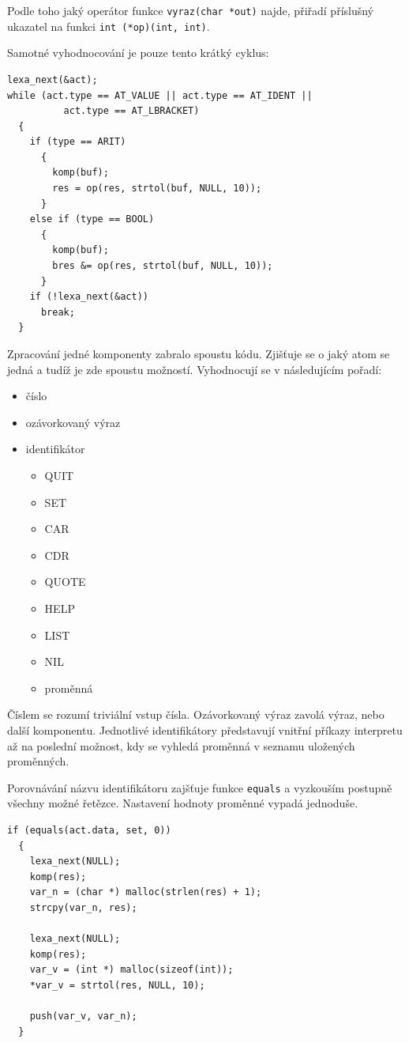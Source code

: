 \documentclass[a4paper, 12pt]{article}
\begin{document}
Podle toho jaký operátor funkce \texttt{vyraz(char *out)} najde,
přiřadí příslušný ukazatel na funkci \verb+int (*op)(int, int)+.

Samotné vyhodnocování je pouze tento krátký cyklus:
\begin{lstlisting}
lexa_next(&act);
while (act.type == AT_VALUE || act.type == AT_IDENT ||
          act.type == AT_LBRACKET)
  {
    if (type == ARIT)
      {
        komp(buf);
        res = op(res, strtol(buf, NULL, 10));
      }
    else if (type == BOOL)
      {
        komp(buf);
        bres &= op(res, strtol(buf, NULL, 10));
      }
    if (!lexa_next(&act))
      break;
  }
\end{lstlisting}

Zpracování jedné komponenty zabralo spoustu kódu.  Zjišťuje se o jaký
atom se jedná a tudíž je zde spoustu možností. Vyhodnocují se v
následujícím pořadí:
\begin{itemize}
\item číslo
\item ozávorkovaný výraz
\item identifikátor
\begin{itemize}
\item QUIT
\item SET
\item CAR
\item CDR
\item QUOTE
\item HELP
\item LIST
\item NIL
\item proměnná
\end{itemize}

\end{itemize}

Číslem se rozumí triviální vstup čísla. Ozávorkovaný výraz zavolá
výraz, nebo další komponentu. Jednotlivé identifikátory představují
vnitřní příkazy interpretu až na poslední možnost, kdy se vyhledá
proměnná v seznamu uložených proměnných.

Porovnávání názvu identifikátoru zajšťuje funkce \texttt{equals} a
vyzkouším postupně všechny možné řetězce. Nastavení hodnoty proměnné
vypadá jednoduše.

\begin{lstlisting}
if (equals(act.data, set, 0))
  {
    lexa_next(NULL);
    komp(res);
    var_n = (char *) malloc(strlen(res) + 1);
    strcpy(var_n, res);

    lexa_next(NULL);
    komp(res);
    var_v = (int *) malloc(sizeof(int));
    *var_v = strtol(res, NULL, 10);
	  
    push(var_v, var_n);
  }
\end{lstlisting}
\end{document}
